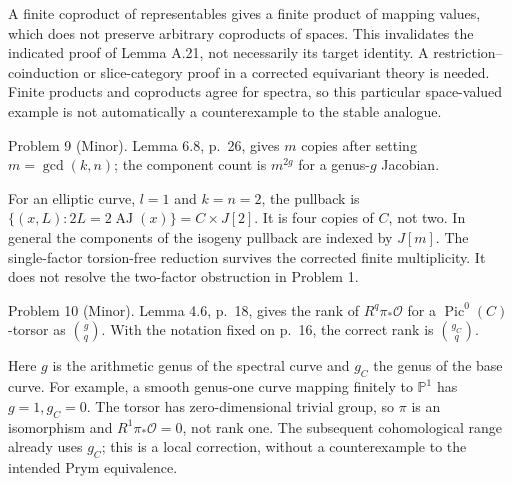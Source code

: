 \documentclass[10pt]{article}
\begin{document}
A finite coproduct of representables gives a finite product of mapping values, which does not preserve arbitrary coproducts of spaces. This invalidates the indicated proof of Lemma A.21, not necessarily its target identity. A restriction–coinduction or slice-category proof in a corrected equivariant theory is needed. Finite products and coproducts agree for spectra, so this particular space-valued example is not automatically a counterexample to the stable analogue.\par
Problem 9 (Minor).  Lemma 6.8, p. 26, gives \(m\) copies after setting \(m=\gcd(k,n)\); the component count is \(m^{2g}\) for a genus-\(g\) Jacobian.\par
For an elliptic curve, \(l=1\) and \(k=n=2\), the pullback is \(\{(x,L):2L=2\operatorname{AJ}(x)\}=C\times J[2]\). It is four copies of \(C\), not two. In general the components of the isogeny pullback are indexed by \(J[m]\). The single-factor torsion-free reduction survives the corrected finite multiplicity. It does not resolve the two-factor obstruction in Problem 1.\par
Problem 10 (Minor).  Lemma 4.6, p. 18, gives the rank of \(R^q\pi_*\mathcal O\) for a \(\operatorname{Pic}^0(C)\)-torsor as \(\binom gq\). With the notation fixed on p. 16, the correct rank is \(\binom{g_C}q\).\par
Here \(g\) is the arithmetic genus of the spectral curve and \(g_C\) the genus of the base curve. For example, a smooth genus-one curve mapping finitely to \(\mathbb P^1\) has \(g=1,g_C=0\). The torsor has zero-dimensional trivial group, so \(\pi\) is an isomorphism and \(R^1\pi_*\mathcal O=0\), not rank one. The subsequent cohomological range already uses \(g_C\); this is a local correction, without a counterexample to the intended Prym equivalence.\par
\end{document}

